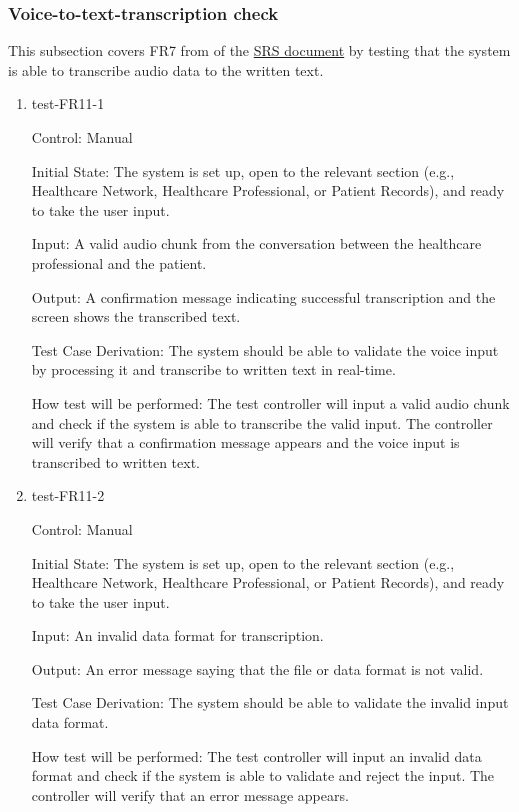 \documentclass[12pt, titlepage]{article}
\begin{document}
\subsubsection{Voice-to-text-transcription check} \label{section:4.1.5}

This subsection covers FR7 from of the \href{https://github.com/Inreet-Kaur/capstone/blob/main/docs/SRS/SRS.pdf} {SRS document} by testing that the system is able to transcribe audio data to the written text.

\begin{enumerate}

\item{test-FR11-1} \label{test-FR11-1}

Control: Manual

Initial State: The system is set up, open to the relevant section (e.g., Healthcare Network, Healthcare Professional, or Patient Records), and ready to take the user input.

Input: A valid audio chunk from the conversation between the healthcare professional and the patient.

Output: A confirmation message indicating successful transcription and the screen shows the transcribed text.

Test Case Derivation: The system should be able to validate the voice input by processing it and transcribe to written text in real-time.

How test will be performed: The test controller will input a valid audio chunk and check if the system is able to transcribe the valid input. The controller will verify that a confirmation message appears and the voice input is transcribed to written text.


\item{test-FR11-2} \label{test-FR11-2}

Control: Manual

Initial State: The system is set up, open to the relevant section (e.g., Healthcare Network, Healthcare Professional, or Patient Records), and ready to take the user input.

Input: An invalid data format for transcription.

Output: An error message saying that the file or data format is not valid.

Test Case Derivation: The system should be able to validate the invalid input data format.

How test will be performed: The test controller will input an invalid data format and check if the system is able to validate and reject the input. The controller will verify that an error message appears.

\end{enumerate}
\end{document}
